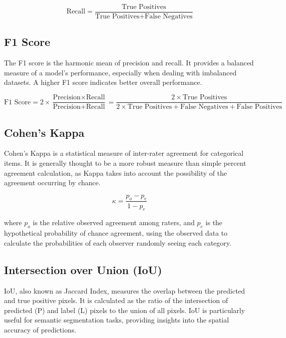 \begin{equation*}
    \text{Recall} = \frac{\text{True Positives}}{\text{True Positives}
        + \text{False Negatives}}
\end{equation*}

\subsection{F1 Score}

The F1 score is the harmonic mean of precision and recall. It provides
a balanced measure of a model's performance, especially when dealing with
imbalanced datasets. A higher F1 score indicates better overall performance.

\begin{equation*}
    \text{F1 Score} = 2 \times \frac{\text{Precision} \times
        \text{Recall}}{\text{Precision} + \text{Recall}} = \frac{2\times
        \text{True
            Positives}}{2\times \text{True Positives} + \text{False Negatives}
        +
        \text{False Positives}}
\end{equation*}

\subsection{Cohen's Kappa}

Cohen's Kappa is a statistical measure of inter-rater agreement for
categorical items. It is generally thought to be a more robust measure than
simple percent agreement calculation, as Kappa takes into account the
possibility of the agreement occurring by chance.

\begin{equation*}
    \kappa = \frac{p_o - p_e}{1 - p_e}
\end{equation*}

where $p_o$ is the relative observed agreement among raters, and $p_e$ is the
hypothetical probability of chance agreement, using the observed data to
calculate the probabilities of each observer randomly seeing each category.

\subsection{Intersection over Union (IoU)}

IoU, also known as Jaccard Index, measures the overlap between the
predicted and true positive pixels. It is calculated as the ratio of the
intersection of predicted (P) and label (L) pixels to the union of all pixels.
IoU is particularly useful for semantic segmentation tasks, providing insights
into the spatial accuracy of predictions.

